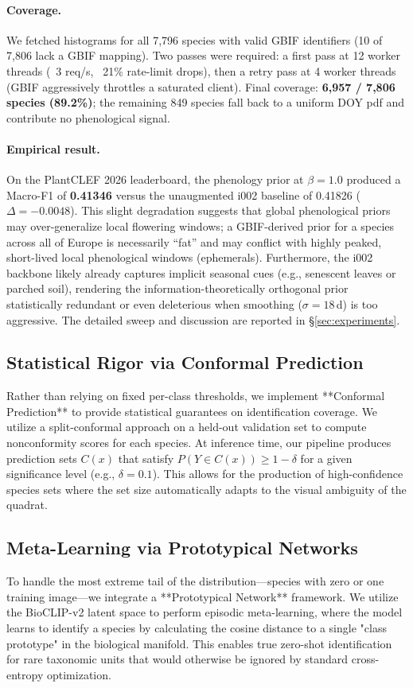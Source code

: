 \documentclass[10pt,twocolumn,letterpaper]{article}
\begin{document}
\paragraph{Coverage.} We fetched histograms for all 7{,}796 species with valid GBIF identifiers (10 of 7{,}806 lack a GBIF mapping). Two passes were required: a first pass at 12 worker threads (~3 req/s, ~21\% rate-limit drops), then a retry pass at 4 worker threads (GBIF aggressively throttles a saturated client). Final coverage: \textbf{6{,}957 / 7{,}806 species (89.2\%)}; the remaining 849 species fall back to a uniform DOY pdf and contribute no phenological signal.

\paragraph{Empirical result.} On the PlantCLEF 2026 leaderboard, the phenology prior at $\beta{=}1.0$ produced a Macro-F1 of \textbf{0.41346} versus the unaugmented i002 baseline of 0.41826 ($\Delta = -0.0048$). This slight degradation suggests that global phenological priors may over-generalize local flowering windows; a GBIF-derived prior for a species across all of Europe is necessarily ``fat'' and may conflict with highly peaked, short-lived local phenological windows (ephemerals). Furthermore, the i002 backbone likely already captures implicit seasonal cues (e.g., senescent leaves or parched soil), rendering the information-theoretically orthogonal prior statistically redundant or even deleterious when smoothing ($\sigma=18$\,d) is too aggressive. The detailed sweep and discussion are reported in \S\ref{sec:experiments}.

\subsection{Statistical Rigor via Conformal Prediction}
Rather than relying on fixed per-class thresholds, we implement **Conformal Prediction** to provide statistical guarantees on identification coverage. We utilize a split-conformal approach on a held-out validation set to compute nonconformity scores for each species. At inference time, our pipeline produces prediction sets $C(x)$ that satisfy $P(Y \in C(x)) \geq 1 - \delta$ for a given significance level (e.g., $\delta=0.1$). This allows for the production of high-confidence species sets where the set size automatically adapts to the visual ambiguity of the quadrat.

\subsection{Meta-Learning via Prototypical Networks}
To handle the most extreme tail of the distribution—species with zero or one training image—we integrate a **Prototypical Network** framework. We utilize the BioCLIP-v2 latent space to perform episodic meta-learning, where the model learns to identify a species by calculating the cosine distance to a single "class prototype" in the biological manifold. This enables true zero-shot identification for rare taxonomic units that would otherwise be ignored by standard cross-entropy optimization.
\end{document}
